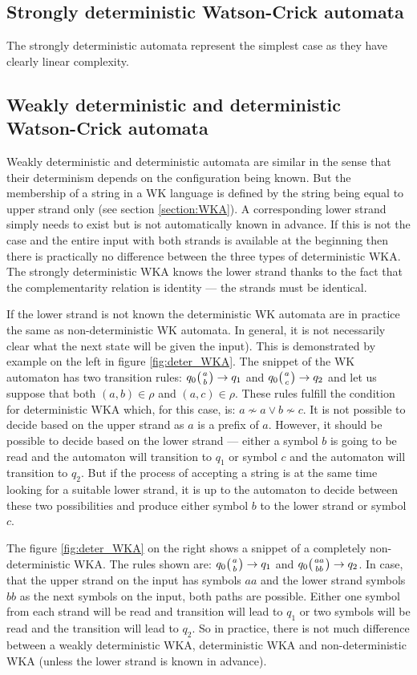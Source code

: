 \subsection{Strongly deterministic Watson-Crick automata}
The strongly deterministic automata represent the simplest case as they have clearly linear complexity.

\subsection{Weakly deterministic and deterministic Watson-Crick automata}
Weakly deterministic and deterministic automata are similar in the sense that their determinism depends on the configuration being known. But the membership of a string in a WK language is defined by the string being equal to upper strand only (see section \ref{section:WKA}). A corresponding lower strand simply needs to exist but is not automatically known in advance. If this is not the case and the entire input with both strands is available at the beginning then there is practically no difference between the three types of deterministic WKA. The strongly deterministic WKA knows the lower strand thanks to the fact that the complementarity relation is identity --- the strands must be identical.

If the lower strand is not known the deterministic WK automata are in practice the same as non-deterministic WK automata. In general, it is not necessarily clear what the next state will be given the input). This is demonstrated by example on the left in figure \ref{fig:deter_WKA}. The snippet of the WK automaton has two transition rules: $q_0 \wkpair{a}{b} \rightarrow q_1$ and $q_0 \wkpair{a}{c} \rightarrow q_2$ and let us suppose that both $(a, b) \in \rho$ and $(a, c) \in \rho$. These rules fulfill the condition for deterministic WKA which, for this case, is: $a \nsim a \vee b \nsim c$. It is not possible to decide based on the upper strand as $a$ is a prefix of $a$. However, it should be possible to decide based on the lower strand --- either a symbol $b$ is going to be read and the automaton will transition to $q_1$ or symbol $c$ and the automaton will transition to $q_2$. But if the process of accepting a string is at the same time looking for a suitable lower strand, it is up to the automaton to decide between these two possibilities and produce either symbol $b$ to the lower strand or symbol $c$.

The figure \ref{fig:deter_WKA} on the right shows a snippet of a completely non-deterministic WKA. The rules shown are: $q_0 \wkpair{a}{b} \rightarrow q_1$ and $q_0 \wkpair{aa}{bb} \rightarrow q_2$. In case, that the upper strand on the input has symbols $aa$ and the lower strand symbols $bb$ as the next symbols on the input, both paths are possible. Either one symbol from each strand will be read and transition will lead to $q_1$ or two symbols will be read and the transition will lead to $q_2$. So in practice, there is not much difference between a weakly deterministic WKA, deterministic WKA and non-deterministic WKA (unless the lower strand is known in advance).

